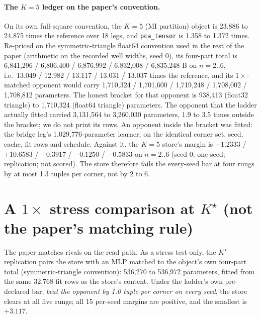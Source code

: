 \documentclass{article} %
\newcommand{\Kstar}{\ensuremath{K^{\star}}}
\begin{document}
\paragraph{The $K=5$ ledger on the paper's convention.} On its own full-square convention, the
$K=5$ (MI partition) object is 23.886 to 24.875 times the reference over 18 legs, and
\texttt{pca\_tensor} is 1.358 to 1.372 times. %
Re-priced on the symmetric-triangle float64 convention used in the rest of the paper (arithmetic
on the recorded well widths, seed 0), its four-part total is 6,841,296 / 6,806,400 / 6,876,992 / 6,832,008
/ 6,835,248 B on $n=2..6$, i.e.\ 13.049 / 12.982 / 13.117 / 13.031 / 13.037 times the reference, and its
$1\times$-matched opponent would carry 1,710,324 / 1,701,600 / 1,719,248 / 1,708,002 / 1,708,812
parameters. %
The honest bracket for that opponent is 938,413 (float32 triangle) to 1,710,324 (float64
triangle) parameters. The opponent that the ladder actually fitted carried 3,131,564 to 3,260,030
parameters, 1.9 to 3.5 times outside the bracket; we do not print its rows.
An opponent inside the bracket was fitted: the bridge leg's 1,029,776-parameter learner, on the
identical corner set, seed, cache, fit rows and schedule. Against it, the $K=5$ store's margin is
$-1.2333$ / $+10.6583$ / $-0.3917$ / $-0.1250$ / $-0.5833$ on $n=2..6$ (seed 0; one seed;
replication; not scored). The store therefore fails the every-seed bar at four rungs by at most
1.3 tuples per corner, not by 2 to 6. %

\section{A $1\times$ stress comparison at $\Kstar$ (not the paper's matching rule)}
\label{app:1x}

The paper matches rivals on the read path. As a stress test only, the $\Kstar$ replication pairs
the store with an MLP matched to the object's own four-part total (symmetric-triangle
convention): 536,270 to 536,972 parameters, fitted from the same 32,768 fit rows as the store's
content. %
Under the ladder's own pre-declared bar, \emph{beat the opponent by 1.0 tuple per corner on every
seed}, the store clears at all five rungs; all 15 per-seed margins are positive, and the smallest
is $+3.117$. %
\end{document}
